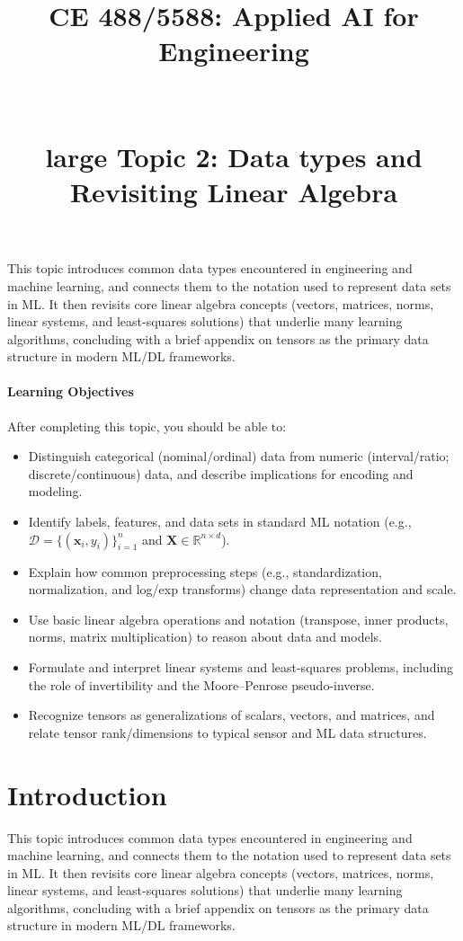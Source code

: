 \documentclass[12pt]{article}
\begin{document}
\doublespacing	

\title{CE 488/5588: Applied AI for Engineering \\\\ \\large Topic 2: Data types and Revisiting Linear Algebra}
\author{}
\date{}

\maketitle

This topic introduces common data types encountered in engineering and machine learning, and connects them to the notation used to represent data sets in ML. It then revisits core linear algebra concepts (vectors, matrices, norms, linear systems, and least-squares solutions) that underlie many learning algorithms, concluding with a brief appendix on tensors as the primary data structure in modern ML/DL frameworks.

\paragraph{Learning Objectives}
After completing this topic, you should be able to:
\begin{itemize}
    \item Distinguish categorical (nominal/ordinal) data from numeric (interval/ratio; discrete/continuous) data, and describe implications for encoding and modeling.
    \item Identify labels, features, and data sets in standard ML notation (e.g., $\mathcal{D}=\{(\bm{x}_i,y_i)\}_{i=1}^n$ and $\bm{X}\in\mathbb{R}^{n\times d}$).
    \item Explain how common preprocessing steps (e.g., standardization, normalization, and log/exp transforms) change data representation and scale.
    \item Use basic linear algebra operations and notation (transpose, inner products, norms, matrix multiplication) to reason about data and models.
    \item Formulate and interpret linear systems and least-squares problems, including the role of invertibility and the Moore--Penrose pseudo-inverse.
    \item Recognize tensors as generalizations of scalars, vectors, and matrices, and relate tensor rank/dimensions to typical sensor and ML data structures.
\end{itemize}

\section*{Introduction}
This topic introduces common data types encountered in engineering and machine learning, and connects them to the notation used to represent data sets in ML. It then revisits core linear algebra concepts (vectors, matrices, norms, linear systems, and least-squares solutions) that underlie many learning algorithms, concluding with a brief appendix on tensors as the primary data structure in modern ML/DL frameworks.
\end{document}
